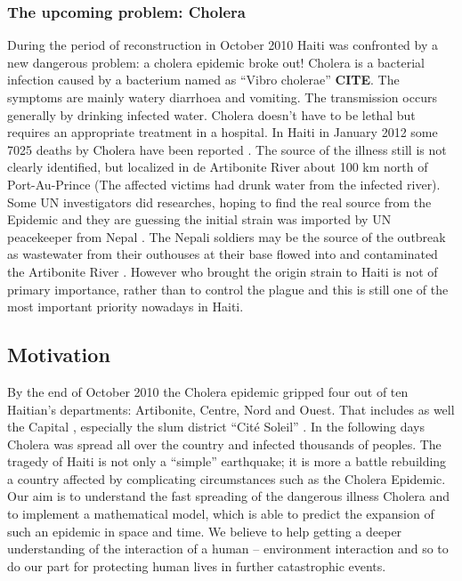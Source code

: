 \documentclass[11pt]{article}
\begin{document}
\subsubsection*{The upcoming problem: Cholera}
During the period of reconstruction in October 2010 Haiti was confronted by a new dangerous problem: a cholera epidemic broke out! 
\newline
Cholera is a bacterial infection caused by a bacterium named as “Vibro cholerae” \textbf{CITE}. The symptoms are mainly watery diarrhoea and vomiting. The transmission occurs generally by drinking infected water. Cholera doesn’t have to be lethal but requires an appropriate treatment in a hospital. In Haiti in January 2012 some 7025 deaths by Cholera have been reported \cite{web:MSPP}.
The source of the illness still is not clearly identified, but localized in de Artibonite River about 100 km north of Port-Au-Prince (The affected victims had drunk water from the infected river). Some UN investigators did researches, hoping to find the real source from the Epidemic and they are guessing the initial strain was imported by UN peacekeeper from Nepal \cite{web:alj}. The Nepali soldiers may be the source of the outbreak as wastewater from their outhouses at their base flowed into and contaminated the Artibonite River  . However who brought the origin strain to Haiti is not of primary importance, rather than to control the plague and this is still one of the most important priority nowadays in Haiti.

\subsection{Motivation}
By the end of October 2010 the Cholera epidemic gripped four out of ten Haitian’s departments: Artibonite, Centre, Nord and Ouest. That includes as well the Capital , especially the slum district “Cité Soleil” \cite{web:alj2}. In the following days Cholera was spread all over the country and infected thousands of peoples. The tragedy of Haiti is not only a “simple” earthquake; it is more a battle rebuilding a country affected by complicating circumstances such as the Cholera Epidemic. 
\newline
Our aim is to understand the fast spreading of the dangerous illness Cholera and to implement a mathematical model, which is able to predict the expansion of such an epidemic in space and time. We believe to help getting a deeper understanding of the interaction of a human – environment interaction and so to do our part for protecting human lives in further catastrophic events.
\end{document}
